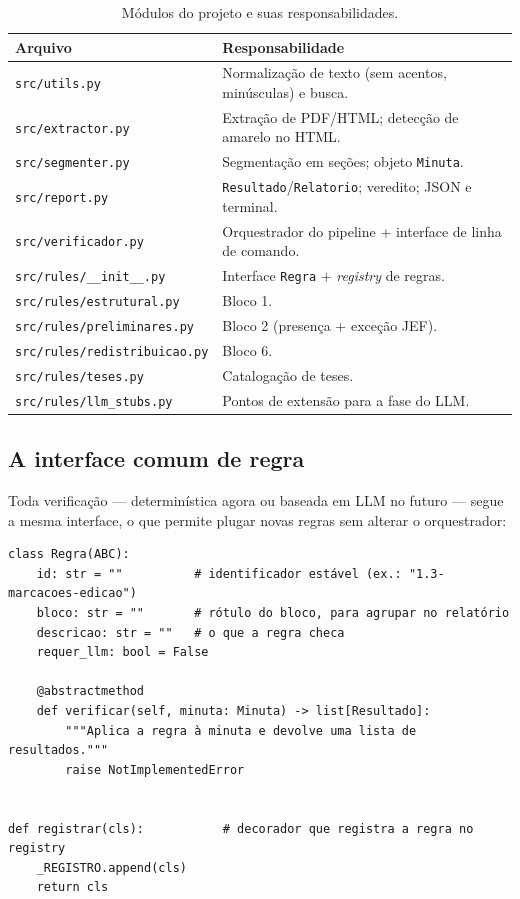 \documentclass[11pt,a4paper]{article}
\begin{document}
\begin{table}[h]
\centering
\small
\begin{tabular}{@{}lp{10.2cm}@{}}
\toprule
\textbf{Arquivo} & \textbf{Responsabilidade} \\
\midrule
\texttt{src/utils.py}            & Normalização de texto (sem acentos, minúsculas) e busca. \\
\texttt{src/extractor.py}        & Extração de PDF/HTML; detecção de amarelo no HTML. \\
\texttt{src/segmenter.py}        & Segmentação em seções; objeto \texttt{Minuta}. \\
\texttt{src/report.py}           & \texttt{Resultado}/\texttt{Relatorio}; veredito; JSON e terminal. \\
\texttt{src/verificador.py}      & Orquestrador do pipeline + interface de linha de comando. \\
\texttt{src/rules/\_\_init\_\_.py} & Interface \texttt{Regra} + \emph{registry} de regras. \\
\texttt{src/rules/estrutural.py} & Bloco 1. \\
\texttt{src/rules/preliminares.py} & Bloco 2 (presença + exceção JEF). \\
\texttt{src/rules/redistribuicao.py} & Bloco 6. \\
\texttt{src/rules/teses.py}      & Catalogação de teses. \\
\texttt{src/rules/llm\_stubs.py} & Pontos de extensão para a fase do LLM. \\
\bottomrule
\end{tabular}
\caption{Módulos do projeto e suas responsabilidades.}
\end{table}

\subsection{A interface comum de regra}
Toda verificação --- determinística agora ou baseada em LLM no futuro --- segue
a mesma interface, o que permite plugar novas regras sem alterar o orquestrador:

\begin{lstlisting}[style=py]
class Regra(ABC):
    id: str = ""          # identificador estável (ex.: "1.3-marcacoes-edicao")
    bloco: str = ""       # rótulo do bloco, para agrupar no relatório
    descricao: str = ""   # o que a regra checa
    requer_llm: bool = False

    @abstractmethod
    def verificar(self, minuta: Minuta) -> list[Resultado]:
        """Aplica a regra à minuta e devolve uma lista de resultados."""
        raise NotImplementedError


def registrar(cls):           # decorador que registra a regra no registry
    _REGISTRO.append(cls)
    return cls
\end{lstlisting}
\end{document}

